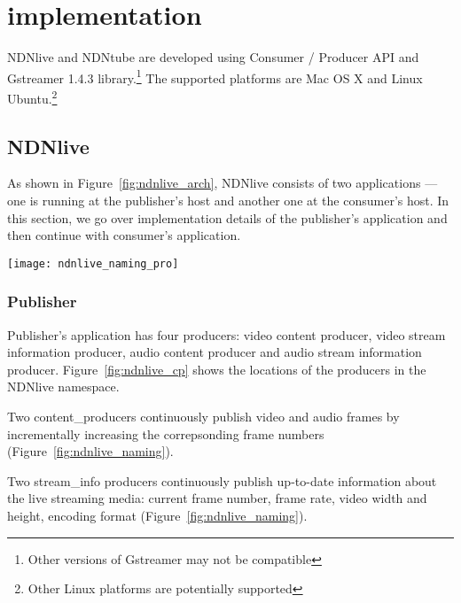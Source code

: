 \section{implementation} %
\label{sec:implementation}
NDNlive and NDNtube are developed using Consumer / Producer API and Gstreamer 1.4.3 library.\footnote{Other versions of Gstreamer may not be compatible}
The supported platforms are Mac OS X and Linux Ubuntu.\footnote{Other Linux platforms are potentially supported} 

\subsection{NDNlive}
As shown in Figure~\ref{fig:ndnlive_arch}, NDNlive consists of two applications --- one is running at the publisher's host and another one at the consumer's host. In this section, we go over implementation details of the publisher's application and then continue with consumer's application.

\begin{figure*}%
  \centering
  \texttt{[image: ndnlive\_naming\_pro]}
  \caption{Locations of producers and consumers in the NDNlive namespace.}
  \label{fig:ndnlive_cp}
\end{figure*}

\subsubsection{Publisher}
\label{ssub:ndnlive_pro}
Publisher's application has four producers: video content producer, video stream information producer, audio content producer and audio stream information producer. Figure~\ref{fig:ndnlive_cp} shows the locations of the producers in the NDNlive namespace. 

Two content\_producers continuously publish video and audio frames by incrementally increasing the correpsonding frame numbers (Figure~\ref{fig:ndnlive_naming}). 

Two stream\_info producers continuously publish up-to-date information about the live streaming media: current frame number, frame rate, video width and height, encoding format (Figure~\ref{fig:ndnlive_naming}).

